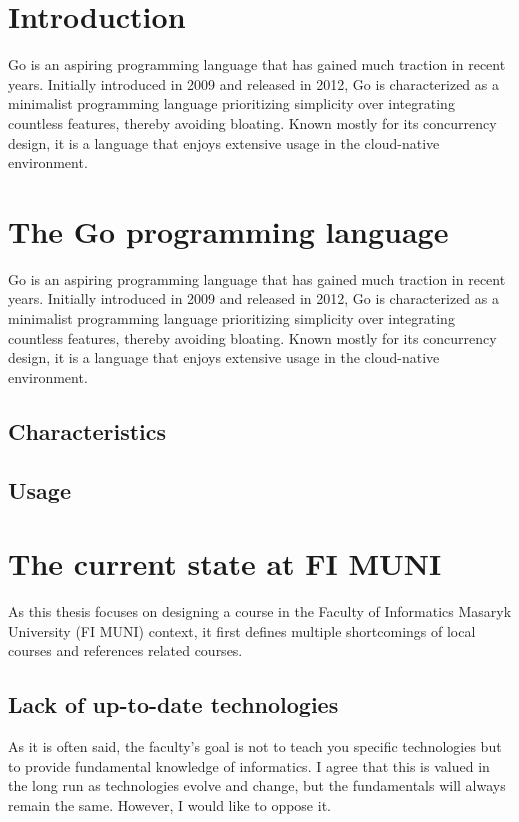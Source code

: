 \documentclass[
  digital,
  color,
  oneside,
  nosansbold,
  nocolorbold,
  lof,
  lot,
]{fithesis4}
\begin{document}
\chapter{Introduction}

Go is an aspiring programming language that has gained much traction in recent years. Initially introduced in 2009 and released in 2012, Go is characterized as a minimalist programming language prioritizing simplicity over integrating countless features, thereby avoiding bloating. Known mostly for its concurrency design, it is a language that enjoys extensive usage in the cloud-native environment.

\chapter{The Go programming language}

Go is an aspiring programming language that has gained much traction in recent years. Initially introduced in 2009 and released in 2012, Go is characterized as a minimalist programming language prioritizing simplicity over integrating countless features, thereby avoiding bloating. Known mostly for its concurrency design, it is a language that enjoys extensive usage in the cloud-native environment.

\section{Characteristics}

\section{Usage}

\chapter{The current state at FI MUNI}

As this thesis focuses on designing a course in the Faculty of Informatics Masaryk University (FI MUNI) context, it first defines multiple shortcomings of local courses and references related courses.

\section{Lack of up-to-date technologies}

As it is often said, the faculty's goal is not to teach you specific technologies but to provide fundamental knowledge of informatics. I agree that this is valued in the long run as technologies evolve and change, but the fundamentals will always remain the same. However, I would like to oppose it.
\end{document}
